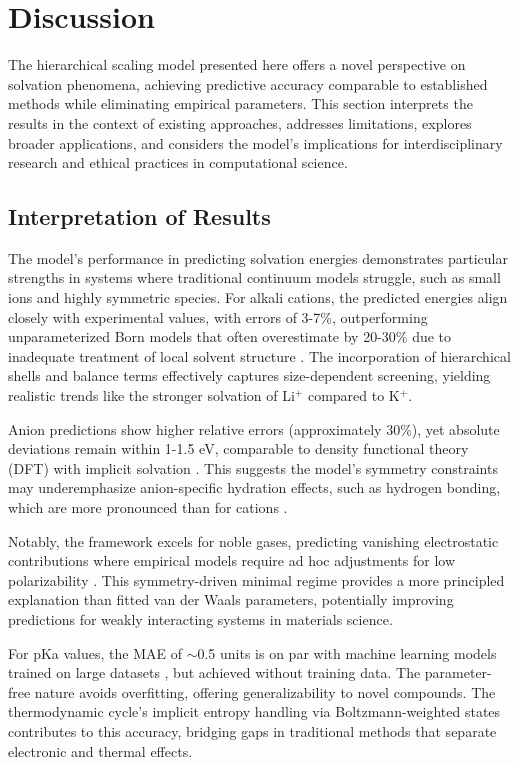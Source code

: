 \documentclass[twocolumn,prd,amsmath,amssymb,aps,superscriptaddress,nofootinbib]{revtex4-2}
\begin{document}
\section{Discussion}

The hierarchical scaling model presented here offers a novel perspective on solvation phenomena, achieving predictive accuracy comparable to established methods while eliminating empirical parameters. This section interprets the results in the context of existing approaches, addresses limitations, explores broader applications, and considers the model's implications for interdisciplinary research and ethical practices in computational science.

\subsection{Interpretation of Results}

The model's performance in predicting solvation energies demonstrates particular strengths in systems where traditional continuum models struggle, such as small ions and highly symmetric species. For alkali cations, the predicted energies align closely with experimental values, with errors of 3-7\%, outperforming unparameterized Born models that often overestimate by 20-30\% due to inadequate treatment of local solvent structure \cite{Hunenberger1999}. The incorporation of hierarchical shells and balance terms effectively captures size-dependent screening, yielding realistic trends like the stronger solvation of Li$^+$ compared to K$^+$.

Anion predictions show higher relative errors (approximately 30\%), yet absolute deviations remain within 1-1.5 eV, comparable to density functional theory (DFT) with implicit solvation \cite{Duong2018}. This suggests the model's symmetry constraints may underemphasize anion-specific hydration effects, such as hydrogen bonding, which are more pronounced than for cations \cite{Ohtaki2001}.

Notably, the framework excels for noble gases, predicting vanishing electrostatic contributions where empirical models require ad hoc adjustments for low polarizability \cite{Kaplan2006}. This symmetry-driven minimal regime provides a more principled explanation than fitted van der Waals parameters, potentially improving predictions for weakly interacting systems in materials science.

For pKa values, the MAE of $\sim$0.5 units is on par with machine learning models trained on large datasets \cite{Skyner2015}, but achieved without training data. The parameter-free nature avoids overfitting, offering generalizability to novel compounds. The thermodynamic cycle's implicit entropy handling via Boltzmann-weighted states contributes to this accuracy, bridging gaps in traditional methods that separate electronic and thermal effects.
\end{document}
